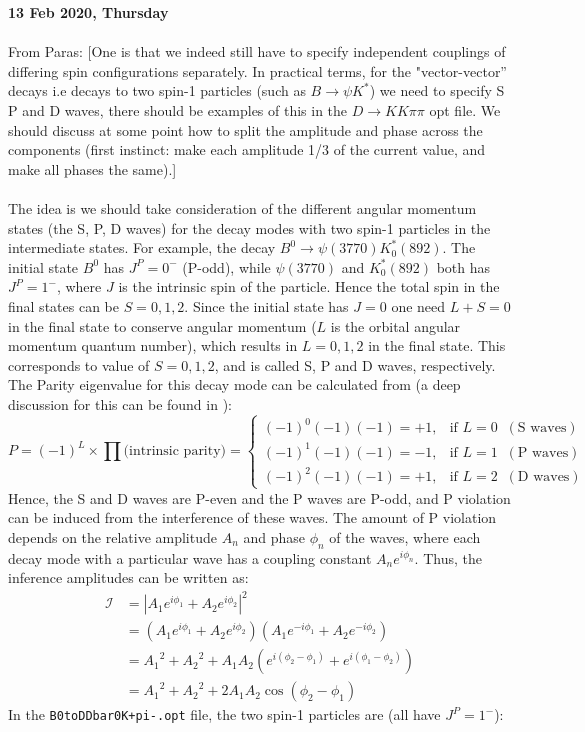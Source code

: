 \clearpage
\noindent\textbf{13 Feb 2020, Thursday}
\\
\\
From Paras: [One is that we indeed still have to specify independent couplings of differing spin configurations separately. In practical terms, for the "vector-vector” decays i.e decays to two spin-1 particles (such as $B\to\psi K^*$) we need to specify S P and D waves, there should be examples of this in the $D\to KK\pi\pi$ opt file. We should discuss at some point how to split the amplitude and phase across the components (first instinct: make each amplitude 1/3 of the current value, and make all phases the same).]
\\
\\
The idea is we should take consideration of the different angular momentum states (the S, P, D waves) for the decay modes with two spin-1 particles in the intermediate states. For example, the decay $B^0\to \psi(3770)K^*_0(892)$. The initial state $B^0$ has $J^P = 0^-$ (P-odd), while $\psi(3770)$ and $K^*_0(892)$ both has $J^P=1^-$, where $J$ is the intrinsic spin of the particle. Hence the total spin in the final states can be $S = 0,1,2$. 
Since the initial state has $J=0$ one need $L+S=0$ in the final state to conserve angular momentum ($L$ is the orbital angular momentum quantum number), which results in $L=0,1,2$ in the final state. This corresponds to value of $S=0,1,2$, and is called S, P and D waves, respectively. The Parity eigenvalue for this decay mode can be calculated from (a deep discussion for this can be found in \autocite{d_Argent_2017}):
\begin{equation}
 P = (-1)^L \times \prod\text{(intrinsic parity)} = 
\begin{cases}
    (-1)^0(-1)(-1) = +1,& \text{if } L=0\;\;(\text{S waves})\\
    (-1)^1(-1)(-1) = -1,& \text{if } L=1\;\;(\text{P waves})\\
    (-1)^2(-1)(-1) = +1,& \text{if } L=2\;\;(\text{D waves})
\end{cases}
\end{equation}
\label{coupling_const}
Hence, the S and D waves are P-even and the P waves are P-odd, and P violation can be induced from the interference of these waves. The amount of P violation depends on the relative amplitude $A_n$ and phase $\phi_n$ of the waves, where each decay mode with a particular wave has a coupling constant $A_n e^{i\phi_n}$. Thus, the inference amplitudes can be written as:
\begin{align}
    \mathcal{I} &= |A_1e^{i\phi_1}+A_2e^{i\phi_2}|^2 \nonumber\\
    &=(A_1e^{i\phi_1}+A_2e^{i\phi_2})(A_1e^{-i\phi_1}+A_2e^{-i\phi_2})\nonumber\\
    &={A_1}^2 + {A_2}^2 + A_1A_2(e^{i(\phi_2-\phi_1)}+e^{i(\phi_1-\phi_2)})\nonumber\\
    &={A_1}^2 + {A_2}^2 + 2A_1A_2\cos(\phi_2-\phi_1)
\end{align}
In the \texttt{B0toDDbar0K+pi-.opt} file, the two spin-1 particles are (all have $J^P=1^-$):

